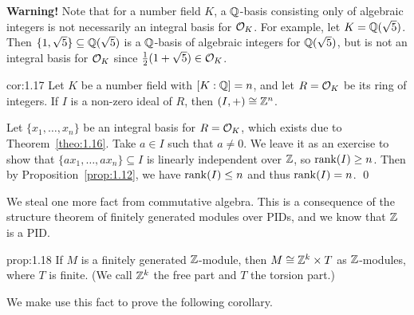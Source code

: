{\bf Warning!} Note that for a number field $K$, a $\mathbb{Q}$-basis consisting only of 
algebraic integers is not necessarily an integral basis for ${\cal O}_K$. For 
example, let $K = \mathbb{Q}(\sqrt{5})$. Then $\{1, \sqrt{5}\} \subseteq 
\mathbb{Q}(\sqrt{5})$ is a $\mathbb{Q}$-basis of algebraic integers for $\mathbb{Q}(\sqrt{5})$, 
but is not an integral basis for ${\cal O}_K$ since $\frac12(1+\sqrt{5}) \in 
{\cal O}_K$. 

\begin{cor}{cor:1.17}
    Let $K$ be a number field with $[K : \mathbb{Q}] = n$, and let $R = {\cal O}_K$ be 
    its ring of integers. If $I$ is a non-zero ideal of $R$, then 
    $(I, +) \cong \mathbb{Z}^n$. 
\end{cor}\vspace{-0.15cm}
\begin{pf}
    Let $\{x_1, \dots, x_n\}$ be an integral basis for $R = {\cal O}_K$, 
    which exists due to Theorem~\ref{theo:1.16}. Take $a \in I$ such that 
    $a \neq 0$. We leave it as an exercise to show that 
    $\{ax_1, \dots, ax_n\} \subseteq I$ is linearly independent over $\mathbb{Z}$, 
    so $\operatorname{rank}(I) \geq n$. Then by Proposition~\ref{prop:1.12}, we have 
    $\operatorname{rank}(I) \leq n$ and thus $\operatorname{rank}(I) = n$. \qed 
\end{pf}\vspace{-0.25cm}

We steal one more fact from commutative algebra. This is a consequence of the 
structure theorem of finitely generated modules over PIDs, and we know that 
$\mathbb{Z}$ is a PID.

\begin{prop}{prop:1.18}
    If $M$ is a finitely generated $\mathbb{Z}$-module, then $M \cong \mathbb{Z}^k \times T$ 
    as $\mathbb{Z}$-modules, where $T$ is finite. (We call $\mathbb{Z}^k$ the free part and $T$ the 
    torsion part.)
\end{prop}\vspace{-0.15cm}

We make use this fact to prove the following corollary.

